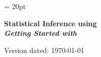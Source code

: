 \documentclass[11pt]{article}
\begin{document}
\renewcommand{\headrulewidth}{0.5pt}
\headsep = 20pt
\lhead{ }

\thispagestyle{plain}
\begin{center}

\textbf{\LARGE Statistical Inference using \RevBayes}\\\vspace{2mm}
\textbf{\it{\Large Getting Started with \RevBayes}}\\\vspace{2mm}
\end{center}

\def \ResourcePath {./}
\def \GlobalResourcePath {../}


Version dated: \today
\end{document}
